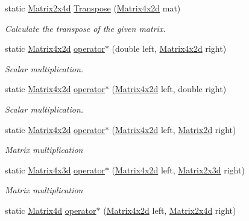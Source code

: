 \begin{DoxyCompactItemize}
static \hyperlink{struct_open_t_k_1_1_matrix2x4d}{Matrix2x4d} \hyperlink{struct_open_t_k_1_1_matrix4x2d_a566e4b514dcf0e26d77c208ed8045718}{Transpose} (\hyperlink{struct_open_t_k_1_1_matrix4x2d}{Matrix4x2d} mat)
\begin{DoxyCompactList}\small\item\em Calculate the transpose of the given matrix. \end{DoxyCompactList}\item 
static \hyperlink{struct_open_t_k_1_1_matrix4x2d}{Matrix4x2d} \hyperlink{struct_open_t_k_1_1_matrix4x2d_af754b2e7bb56c93fb34f62ce4aa67dd0}{operator$\ast$} (double left, \hyperlink{struct_open_t_k_1_1_matrix4x2d}{Matrix4x2d} right)
\begin{DoxyCompactList}\small\item\em Scalar multiplication. \end{DoxyCompactList}\item 
static \hyperlink{struct_open_t_k_1_1_matrix4x2d}{Matrix4x2d} \hyperlink{struct_open_t_k_1_1_matrix4x2d_ad192e55575e18f155ca3e545277c732b}{operator$\ast$} (\hyperlink{struct_open_t_k_1_1_matrix4x2d}{Matrix4x2d} left, double right)
\begin{DoxyCompactList}\small\item\em Scalar multiplication. \end{DoxyCompactList}\item 
static \hyperlink{struct_open_t_k_1_1_matrix4x2d}{Matrix4x2d} \hyperlink{struct_open_t_k_1_1_matrix4x2d_a56fca3f75c90156bc1c9e5e19b6590e1}{operator$\ast$} (\hyperlink{struct_open_t_k_1_1_matrix4x2d}{Matrix4x2d} left, \hyperlink{struct_open_t_k_1_1_matrix2d}{Matrix2d} right)
\begin{DoxyCompactList}\small\item\em Matrix multiplication \end{DoxyCompactList}\item 
static \hyperlink{struct_open_t_k_1_1_matrix4x3d}{Matrix4x3d} \hyperlink{struct_open_t_k_1_1_matrix4x2d_a22c083f32abc174af70f4ca78b5aa7aa}{operator$\ast$} (\hyperlink{struct_open_t_k_1_1_matrix4x2d}{Matrix4x2d} left, \hyperlink{struct_open_t_k_1_1_matrix2x3d}{Matrix2x3d} right)
\begin{DoxyCompactList}\small\item\em Matrix multiplication \end{DoxyCompactList}\item 
static \hyperlink{struct_open_t_k_1_1_matrix4d}{Matrix4d} \hyperlink{struct_open_t_k_1_1_matrix4x2d_af4497255d77a263e698050537a9fea72}{operator$\ast$} (\hyperlink{struct_open_t_k_1_1_matrix4x2d}{Matrix4x2d} left, \hyperlink{struct_open_t_k_1_1_matrix2x4d}{Matrix2x4d} right)

\end{DoxyCompactItemize}
